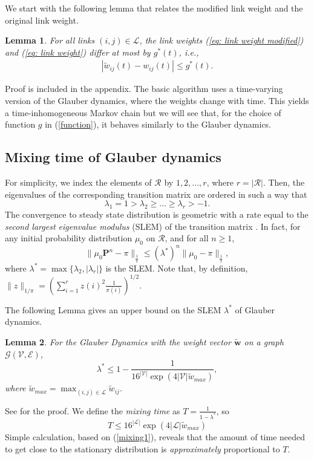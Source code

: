 \documentclass[10pt,onecolumn,draftclsnofoot,journal]{IEEEtran}
\newtheorem{lemma}{Lemma}
\newcommand{\be}{\begin{eqnarray}}
\newcommand{\ee}{\end{eqnarray}}
\newcommand{\cG}{\mathcal{G}}
\newcommand{\cV}{\mathcal{V}}
\newcommand{\cE}{\mathcal{E}}
\begin{document}
We start with the following lemma that relates the modified link weight and the original link weight.
\begin{lemma}\label{relate1}
For all links $(i,j) \in \mathcal{L}$, the link weights (\ref{eq: link weight modified}) and (\ref{eq: link weight}) differ at most by $g^*(t)$, i.e.,
\be
|\tilde{w}_{ij}(t) - w_{ij}(t)| \leq g^*(t).
\ee
\end{lemma}
Proof is included in the appendix.
The basic algorithm uses a time-varying version of the Glauber dynamics, where the weights change with time. This yields a time-inhomogeneous Markov chain but we will see that, for the choice of function $g$ in (\ref{function}), it behaves similarly to the Glauber dynamics.
\subsection*{Mixing time of Glauber dynamics}
For simplicity, we index the elements of $\mathcal{R}$ by $1,2,...,r$, where $r=|\mathcal{R}|$.
Then, the eigenvalues of the corresponding transition matrix are ordered in such a way that
$$
\lambda_1 =1>\lambda_2 \geq ... \geq \lambda_r > -1.
$$
The convergence to steady state distribution is geometric with a rate equal to the \textit{second largest eigenvalue modulus} (SLEM) of the transition matrix \cite{pier}. In fact, for any initial probability distribution $\mu_0$ on $\mathcal{R}$, and for all $n \geq 1$,
\begin{equation}\label{mixing1}
\|\mu_0 \mathbf{P}^n-\pi\| _{\frac{1}{\pi}} \leq (\lambda^*)^n \|\mu_0-\pi\| _{\frac{1}{\pi}},
\end{equation}
where $\lambda^*=\max\{\lambda_2, |\lambda_r|\}$ is the SLEM.
Note that, by definition,
$
\|z\|_{1/\pi}=\left(\sum_{i=1}^r z(i)^2\frac{1}{\pi(i)}\right)^{1/2}.
$

The following Lemma gives an upper bound on the SLEM $\lambda^*$ of Glauber dynamics.
\begin{lemma}\label{mixing2}
For the Glauber Dynamics with the weight vector $\mathbf{\tilde{w}}$ on a graph $\cG(\cV,\cE)$,
$$
\lambda^* \leq 1-\frac{1}{16^{|\cV|}\exp(4|\cV|\tilde{w}_{max})},
$$
where $\tilde{w}_{max}=\max_{(i,j) \in \mathcal{L}} \tilde{w}_{ij}$.
\end{lemma}
See \cite{ghaderi} for the proof. We define the \textit{mixing time} as $T=\frac{1}{1-\lambda^*}$, so
\begin{equation} \label{mixing3}
T \leq 16^{|\mathcal{L}|}\exp(4|\mathcal{L}|\tilde{w}_{max})
\end{equation}
Simple calculation, based on (\ref{mixing1}), reveals that the amount of time needed to get close to the stationary distribution is \textit{approximately} proportional to $T$.
\end{document}
